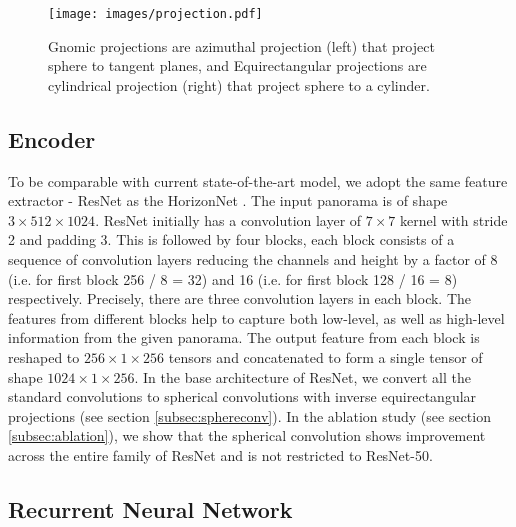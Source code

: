 \documentclass[final]{cvpr}
\begin{document}
\begin{figure}
    \centering
    \texttt{[image: images/projection.pdf]}
    \caption{Gnomic projections are azimuthal projection (left) that project sphere to tangent planes, and Equirectangular projections are cylindrical projection (right) that project sphere to a cylinder.}
    \label{fig:projection}
\end{figure}



\subsection{Encoder}\label{subsec:enc}
To be comparable with current state-of-the-art model, we adopt the same feature extractor - ResNet \cite{he2016deep} as the HorizonNet \cite{sun2019horizonnet}. The input panorama is of shape \textit{$3\times512\times1024$}. ResNet initially has a convolution layer of $7 \times 7$ kernel with stride 2 and padding 3. This is followed by four blocks, each block consists of a sequence of convolution layers reducing the channels and height by a factor of 8 (i.e. for first block 256 / 8 = 32) and 16 (i.e. for first block 128 / 16 = 8) respectively. Precisely, there are three convolution layers in each block. The features from different blocks help to capture both low-level, as well as high-level information \cite{kumar2020noisy} from the given panorama. The output feature from each block is reshaped to \textit{$256 \times 1 \times 256$} tensors and concatenated to form a single tensor of shape \textit{$1024 \times 1 \times 256$}. In the base architecture of ResNet, we convert all the standard convolutions to spherical convolutions with inverse equirectangular projections (see section \ref{subsec:sphereconv}). In the ablation study (see section \ref{subsec:ablation}), we show that the spherical convolution shows improvement across the entire family of ResNet and is not restricted to ResNet-50. 


\subsection{Recurrent Neural Network}\label{subsec:rnn}
\end{document}

